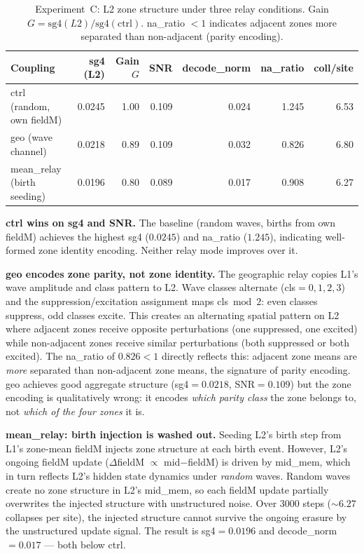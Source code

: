 \documentclass[11pt,a4paper]{article}
\begin{document}
\begin{table}[h]
\centering
\caption{Experiment~C: L2 zone structure under three relay conditions.
Gain $G = \mathrm{sg4}(L2) / \mathrm{sg4}(\mathrm{ctrl})$.
na\_ratio $< 1$ indicates adjacent zones more separated than non-adjacent (parity encoding).}
\label{tab:expc}
\begin{tabular}{lrrrrrr}
\toprule
Coupling & sg4 (L2) & Gain $G$ & SNR & decode\_norm & na\_ratio & coll/site \\
\midrule
ctrl (random, own fieldM)    & 0.0245 & 1.00 & 0.109 & 0.024 & 1.245 & 6.53 \\
geo (wave channel)           & 0.0218 & 0.89 & 0.109 & 0.032 & 0.826 & 6.80 \\
mean\_relay (birth seeding)  & 0.0196 & 0.80 & 0.089 & 0.017 & 0.908 & 6.27 \\
\bottomrule
\end{tabular}
\end{table}

\textbf{ctrl wins on sg4 and SNR.}
The baseline (random waves, births from own fieldM) achieves the highest sg4 ($0.0245$)
and na\_ratio ($1.245$), indicating well-formed zone identity encoding.
Neither relay mode improves over it.

\textbf{geo encodes zone parity, not zone identity.}
The geographic relay copies L1's wave amplitude and class pattern to L2.
Wave classes alternate (cls$=0,1,2,3$) and the suppression/excitation assignment
maps cls$\bmod 2$: even classes suppress, odd classes excite.
This creates an alternating spatial pattern on L2 where adjacent zones receive
opposite perturbations (one suppressed, one excited) while non-adjacent zones
receive similar perturbations (both suppressed or both excited).
The na\_ratio of $0.826 < 1$ directly reflects this:
adjacent zone means are \emph{more} separated than non-adjacent zone means,
the signature of parity encoding.
geo achieves good aggregate structure (sg4$=0.0218$, SNR$=0.109$) but the
zone encoding is qualitatively wrong: it encodes \emph{which parity class} the
zone belongs to, not \emph{which of the four zones} it is.

\textbf{mean\_relay: birth injection is washed out.}
Seeding L2's birth step from L1's zone-mean fieldM injects zone structure at each
birth event.
However, L2's ongoing fieldM update ($\Delta$fieldM $\propto$ mid$-$fieldM) is
driven by mid\_mem, which in turn reflects L2's hidden state dynamics under
\emph{random} waves.
Random waves create no zone structure in L2's mid\_mem, so each fieldM update
partially overwrites the injected structure with unstructured noise.
Over 3000 steps ($\sim 6.27$ collapses per site), the injected structure cannot
survive the ongoing erasure by the unstructured update signal.
The result is sg4$=0.0196$ and decode\_norm$=0.017$ --- both below ctrl.
\end{document}
